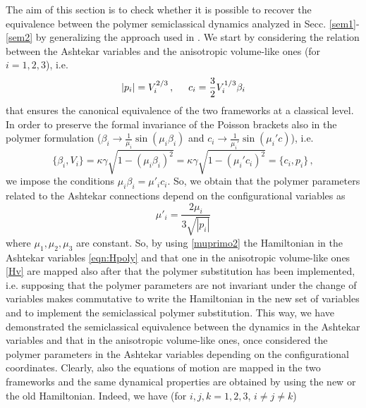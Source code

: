 \documentclass[aps,prd,twocolumn,nofootinbib,superscriptaddress]{revtex4-2}
\begin{document}
The aim of this section is to check whether it is possible to recover the equivalence between the polymer semiclassical dynamics analyzed in Secc. \ref{sem1}-\ref{sem2} by generalizing the approach used in \cite{EFG}. We start by considering the relation between the Ashtekar variables and the anisotropic volume-like ones (for $i=1,2,3$), i.e.
\begin{equation}
	|p_i|=V_i^{2/3}\,, \hspace{0.5cm} c_i=\frac{3}{2}V_i^{1/3}\beta_i
\end{equation}
that ensures the canonical equivalence of the two frameworks at a classical level. In order to preserve the formal invariance of the Poisson brackets also in the polymer formulation ($\beta_i\rightarrow\frac{1}{\mu_i}\sin(\mu_i\beta_i)$ and $c_i\rightarrow\frac{1}{\mu_i'}\sin(\mu_i'c)$), i.e. 
\begin{equation}
\{\beta_i,V_i\}=\kappa\gamma\sqrt{1-(\mu_i\beta_i)^2}=\kappa\gamma\sqrt{1-(\mu_i'c_i)^2}=\{c_i,p_i\}\,,
\end{equation}
we impose the conditions $\mu_i\beta_i=\mu'_ic_i$. So, we obtain that the polymer parameters related to the Ashtekar connections depend on the configurational variables as 
\begin{equation}
\mu'_i=\frac{2\mu_{i}}{3\sqrt{|p_i|}}
\label{muprimo2}
\end{equation}
where $\mu_1,\mu_2,\mu_3$ are constant. So, by using \eqref{muprimo2} the Hamiltonian in the Ashtekar variables \eqref{eqn:Hpoly} and that one in the anisotropic volume-like ones \eqref{Hv} are mapped also after that the polymer substitution has been implemented, i.e. supposing that the polymer parameters are not invariant under the change of variables makes commutative to write the Hamiltonian in the new set of variables and to implement the semiclassical polymer substitution. This way, we have demonstrated the semiclassical equivalence between the dynamics in the Ashtekar variables and that in the anisotropic volume-like ones, once considered the polymer parameters in the Ashtekar variables depending on the configurational coordinates.
Clearly, also the equations of motion are mapped in the two frameworks and the same dynamical properties are obtained by using the new or the old Hamiltonian. Indeed, we have (for $i,j,k=1,2,3$, $i\neq j\neq k$)
\end{document}
